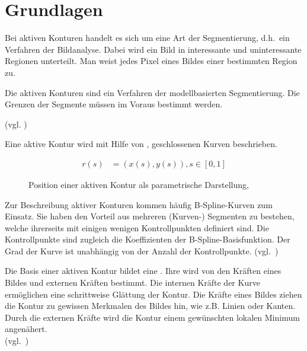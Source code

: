 \chapter{Grundlagen}
\label{chap:basics}


Bei aktiven Konturen handelt es sich um eine Art der Segmentierung, d.h.\ ein Verfahren der Bildanalyse. Dabei wird ein Bild in interessante und uninteressante Regionen unterteilt. Man weist jedes Pixel eines Bildes einer bestimmten Region zu.

Die aktiven Konturen sind ein Verfahren der modellbasierten Segmentierung. Die Grenzen der Segmente müssen im Voraus bestimmt werden.

(vgl. \citeauthor*[S. 133 und 144]{hudritsch:script:cp}) %

Eine aktive Kontur wird mit Hilfe von , geschlossenen Kurven beschrieben.

\begin{figure}[H]
    \begin{align}
        r(s) & = (x(s), y(s)), s \in [0,1]
    \end{align}
    \caption{Position einer aktiven Kontur als parametrische Darstellung,~\cite{kass88snakes:active}}
\end{figure}

Zur Beschreibung aktiver Konturen kommen häufig B-Spline-Kurven zum Einsatz. Sie haben den Vorteil aus mehreren (Kurven-) Segmenten zu bestehen, welche ihrerseits mit einigen wenigen Kontrollpunkten definiert sind. Die Kontrollpunkte sind zugleich die Koeffizienten der B-Spline-Basisfunktion. Der Grad der Kurve ist unabhängig von der Anzahl der Kontrollpunkte. (vgl.~\citeauthor*[S. 79]{fuhrer:script:splines}) %

Die Basis einer aktiven Kontur bildet eine . Ihre  wird von den Kräften eines Bildes und externen Kräften bestimmt. Die internen Kräfte der Kurve ermöglichen eine schrittweise Glättung der Kontur. Die Kräfte eines Bildes ziehen die Kontur zu gewissen Merkmalen des Bildes hin, wie z.B. Linien oder Kanten. Durch die externen Kräfte wird die Kontur einem gewünschten lokalen Minimum angenähert.\\
(vgl.~\citeauthor*[S. 323]{kass88snakes:active}) %

